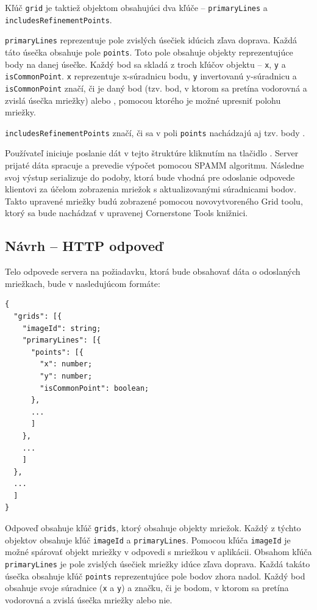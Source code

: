 Kľúč \texttt{grid} je taktiež objektom obsahujúci dva kľúče -- \texttt{primaryLines} a \texttt{includesRefinementPoints}.

\texttt{primaryLines} reprezentuje pole zvislých úsečiek idúcich zľava doprava.
Každá táto úsečka obsahuje pole \texttt{points}. Toto pole obsahuje objekty reprezentujúce body na danej úsečke.
Každý bod sa skladá z troch kľúčov objektu -- \texttt{x}, \texttt{y} a \texttt{isCommonPoint}. \texttt{x} reprezentuje x-súradnicu bodu, \texttt{y} invertovanú y-súradnicu a \texttt{isCommonPoint} značí, či je daný bod  (tzv. bod, v ktorom sa pretína vodorovná a zvislá úsečka mriežky) alebo , pomocou ktorého je možné upresniť polohu mriežky. 

\texttt{includesRefinementPoints} značí, či sa v poli \texttt{points} nachádzajú aj tzv.  body .

Používateľ iniciuje poslanie dát v tejto štruktúre kliknutím na tlačidlo .
Server prijaté dáta spracuje a prevedie výpočet pomocou SPAMM algoritmu. Následne svoj výstup serializuje do podoby, ktorá bude vhodná pre odoslanie odpovede klientovi za účelom zobrazenia mriežok s aktualizovanými súradnicami bodov. Takto upravené mriežky budú zobrazené pomocou novovytvoreného Grid toolu, ktorý sa bude nachádzať v upravenej Cornerstone Tools knižnici. \clearpage

\subsection{Návrh -- HTTP odpoveď}

Telo odpovede servera na požiadavku, ktorá bude obsahovať dáta o odoslaných mriežkach, bude v nasledujúcom formáte:
\begin{verbatim}
{
  "grids": [{
    "imageId": string;
    "primaryLines": [{
      "points": [{
        "x": number;
        "y": number;
        "isCommonPoint": boolean;
      },
      ...
      ]
    },
    ...
    ]
  },
  ...
  ]
}
\end{verbatim}

Odpoveď obsahuje kľúč \texttt{grids}, ktorý obsahuje objekty mriežok. Každý z týchto objektov obsahuje kľúč \texttt{imageId} a \texttt{primaryLines}. Pomocou kľúča \texttt{imageId} je možné spárovať objekt mriežky v odpovedi s mriežkou v aplikácii. Obsahom kľúča \texttt{primaryLines} je pole zvislých úsečiek mriežky idúce zľava doprava.  Každá takáto úsečka obsahuje kľúč \texttt{points} reprezentujúce pole bodov zhora nadol. Každý bod obsahuje svoje súradnice (\texttt{x} a \texttt{y}) a značku, či je bodom, v ktorom sa pretína vodorovná a zvislá úsečka mriežky alebo nie.
\clearpage

